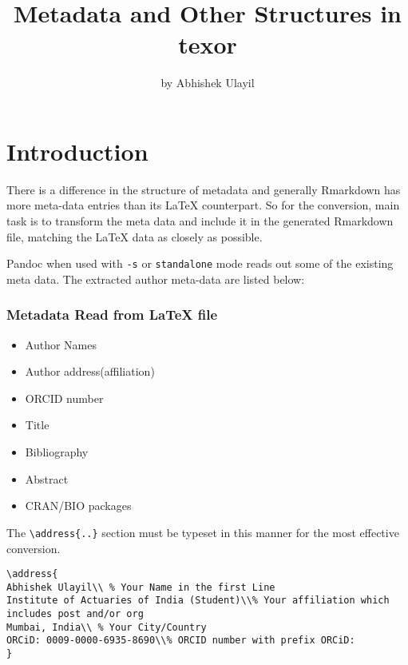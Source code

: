 \title{Metadata and Other Structures in texor}
\author{by Abhishek Ulayil}

\maketitle


\section{Introduction}
There is a difference in the structure of metadata and generally Rmarkdown has more
meta-data entries than its LaTeX counterpart. So for the conversion, main task is to 
transform the meta data and include it in the generated Rmarkdown file, matching the
LaTeX data as closely as possible.

Pandoc when used with \verb|-s| or \verb|standalone| mode reads out some of the existing
meta data. The extracted author meta-data are listed below:


\subsubsection{Metadata Read from LaTeX file}

\begin{itemize}
  \item Author Names 
  \item Author address(affiliation)
  \item ORCID number
  \item Title
  \item Bibliography
  \item Abstract
  \item CRAN/BIO packages
\end{itemize}

The \verb|\address{..}| section must be typeset in this manner for the most 
effective conversion.
\begin{verbatim}
\address{
Abhishek Ulayil\\ % Your Name in the first Line
Institute of Actuaries of India (Student)\\% Your affiliation which includes post and/or org
Mumbai, India\\ % Your City/Country
ORCiD: 0009-0000-6935-8690\\% ORCID number with prefix ORCiD: 
}
\end{verbatim}

